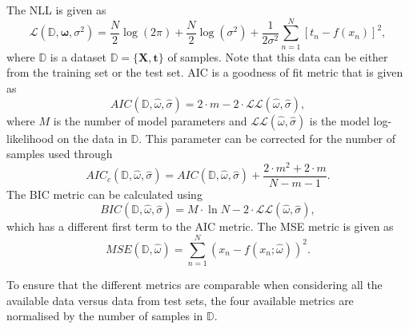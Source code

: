 \documentclass{article}
\begin{document}
The NLL is given as
\begin{equation}
\mathcal{L}(\mathbb{D}, \boldsymbol\omega, \sigma^2) = \frac{N}{2}\log \left( 2\pi \right) + \frac{N}{2}\log \left( \sigma^2 \right) + \frac{1}{2\sigma^2}\sum_{n=1}^{N}\left[ t_n - f(x_n)\right] ^2,
\end{equation}
where $\mathbb{D}$ is a dataset $\mathbb{D}=\{\mathbf{X}, \mathbf{t}\}$ of samples. Note that this data can be either from the training set or the test set. AIC is a goodness of fit metric that is given as
\begin{equation}
    AIC(\mathbb{D}, \hat{\omega}, \hat{\sigma}) = 2\cdot m - 2 \cdot \mathcal{LL}(\hat{\omega}, \hat{\sigma}),
\end{equation}
where $M$ is the number of model parameters and $\mathcal{LL}(\hat{\omega}, \hat{\sigma})$ is the model log-likelihood on the data in $\mathbb{D}$. This parameter can be corrected for the number of samples used through 
\begin{equation}
    AIC_c(\mathbb{D}, \hat{\omega}, \hat{\sigma}) = AIC(\mathbb{D}, \hat{\omega}, \hat{\sigma}) + \frac{2\cdot m^2 + 2\cdot m}{N - m - 1}.
\end{equation}
The BIC metric can be calculated using
\begin{equation}
    BIC(\mathbb{D}, \hat{\omega}, \hat{\sigma}) = M \cdot \ln{N} - 2 \cdot \mathcal{LL}(\hat{\omega}, \hat{\sigma}),
\end{equation}
which has a different first term to the AIC metric. The MSE metric is given as
\begin{equation}
    MSE(\mathbb{D}, \hat{\omega}) = \sum_{n=1}^{N} \left( x_n - f(x_n; \hat{\omega}) \right)^2.
\end{equation}

To ensure that the different metrics are comparable when considering all the available data versus data from test sets, the four available metrics are normalised by the number of samples in $\mathbb{D}$.
\end{document}
